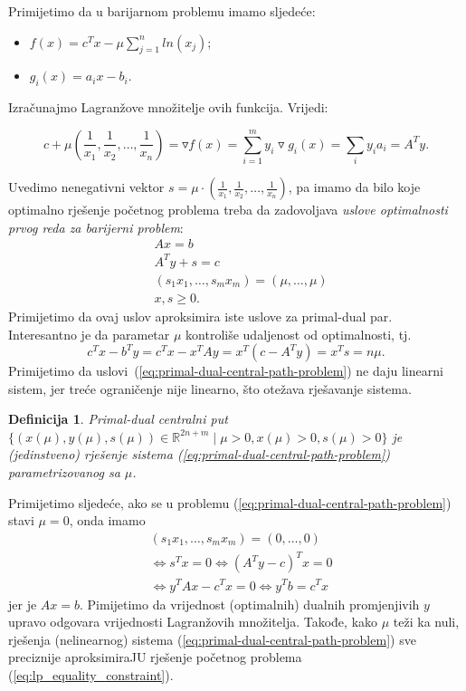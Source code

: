 \documentclass[a4paper, utf8, 11pt, colorlinks]{book}
\newtheorem{definition}{Definicija}[chapter]
\theoremstyle{definition}
\begin{document}
Primijetimo da u barijarnom problemu imamo sljedeće:
\begin{itemize}
	\item $f(x) =   c^T x - \mu \sum_{j=1}^n ln(x_j) $;
	\item $g_i(x) = a_i x - b_i$.
\end{itemize}
Izračunajmo Lagranžove množitelje ovih funkcija. Vrijedi:

$$c + \mu \left(\frac{1}{x_1}, \frac{1}{x_2}, \ldots, \frac{1}{x_n} \right) = \triangledown f (x) =\sum_{i=1}^m y_i \triangledown g_i(x) = \sum_{i} y_i a_i = A^T y.$$ 

Uvedimo nenegativni vektor $s =\mu \cdot \left(\frac{1}{x_1}, \frac{1}{x_2}, \ldots, \frac{1}{x_n}\right)$, pa imamo da bilo koje optimalno rješenje početnog problema treba da zadovoljava \emph{uslove optimalnosti prvog reda za barijerni problem}:
\begin{align}
	&A x = b \nonumber \\
	&A^T y + s = c  \nonumber \\
	& (s_1 x_1, \ldots, s_m x_m) = (\mu, \ldots, \mu) \label{eq:primal-dual-central-path-problem} \\
	& x, s \geq 0. \nonumber
\end{align}
Primijetimo da ovaj uslov aproksimira iste uslove za primal-dual par.  
Interesantno je da parametar $\mu$ kontroliše udaljenost od optimalnosti, tj. 
$$ c^T x - b^T y = c^T x - x^T A y = x^T(c- A^Ty ) = x^T s = n \mu.$$
Primijetimo da uslovi~(\ref{eq:primal-dual-central-path-problem}) ne daju linearni sistem, jer treće ograničenje  nije linearno, što otežava rješavanje sistema.

\begin{definition}
	Primal-dual centralni put $\{(x(\mu), y(\mu), s(\mu)) \in \mathbb{R}^{2n + m} \mid \mu > 0, x(\mu) >0, s(\mu)>0 \}$ je (jedinstveno) rješenje sistema  (\ref{eq:primal-dual-central-path-problem}) parametrizovanog sa $\mu$. 
\end{definition}

Primijetimo sljedeće, ako se u problemu (\ref{eq:primal-dual-central-path-problem}) stavi $\mu = 0$, onda imamo 
\begin{align*}
	&(s_1 x_1, \ldots, s_m x_m) = (0, \ldots, 0) \\
	&\Longleftrightarrow s^T x = 0  \Longleftrightarrow (A^T y - c)^T x = 0 \\
	&\Longleftrightarrow y^T A x - c^T x = 0 \Longleftrightarrow y^T b = c^Tx
\end{align*}
jer je $Ax = b$. Pimijetimo da   vrijednost (optimalnih) dualnih promjenjivih $y$ upravo odgovara vrijednosti Lagranžovih množitelja. Takođe, kako $\mu$ teži ka nuli,  rješenja (nelinearnog) sistema  (\ref{eq:primal-dual-central-path-problem})   sve preciznije aproksimiraJU rješenje početnog problema (\ref{eq:lp_equality_constraint}). 
\end{document}
